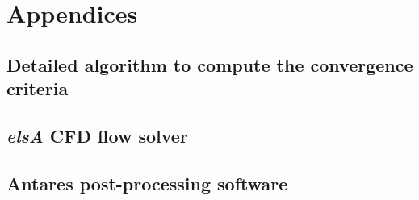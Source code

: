 \documentclass[a4paper, twoside, 11pt]{book}
\begin{document}




\appendix
\part*{Appendices}
\chapter{Detailed algorithm to compute the convergence criteria}


\chapter{\emph{elsA} CFD flow solver}


\chapter{Antares post-processing software}



\backmatter


\label{Bibliography}




\end{document}
